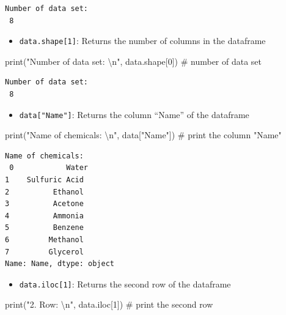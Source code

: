 \documentclass[
  letterpaper,
  DIV=11,
  numbers=noendperiod]{scrreprt}
\newenvironment{Shaded}{\begin{snugshade}}{\end{snugshade}}
\newcommand{\BuiltInTok}[1]{\textcolor[rgb]{0.00,0.23,0.31}{#1}}
\newcommand{\CharTok}[1]{\textcolor[rgb]{0.13,0.47,0.30}{#1}}
\newcommand{\CommentTok}[1]{\textcolor[rgb]{0.37,0.37,0.37}{#1}}
\newcommand{\DecValTok}[1]{\textcolor[rgb]{0.68,0.00,0.00}{#1}}
\newcommand{\NormalTok}[1]{\textcolor[rgb]{0.00,0.23,0.31}{#1}}
\newcommand{\StringTok}[1]{\textcolor[rgb]{0.13,0.47,0.30}{#1}}
\providecommand{\tightlist}{%
  \setlength{\itemsep}{0pt}\setlength{\parskip}{0pt}}\usepackage{longtable,booktabs,array}
\begin{document}
\begin{verbatim}
Number of data set: 
 8
\end{verbatim}

\begin{itemize}
\tightlist
\item
  \texttt{data.shape{[}1{]}}: Returns the number of columns in the
  dataframe
\end{itemize}

\begin{Shaded}
\begin{Highlighting}[]
\BuiltInTok{print}\NormalTok{(}\StringTok{"Number of data set: }\CharTok{\textbackslash{}n}\StringTok{"}\NormalTok{, data.shape[}\DecValTok{0}\NormalTok{]) }\CommentTok{\# number of data set}
\end{Highlighting}
\end{Shaded}

\begin{verbatim}
Number of data set: 
 8
\end{verbatim}

\begin{itemize}
\tightlist
\item
  \texttt{data{[}"Name"{]}}: Returns the column ``Name'' of the
  dataframe
\end{itemize}

\begin{Shaded}
\begin{Highlighting}[]
\BuiltInTok{print}\NormalTok{(}\StringTok{"Name of chemicals: }\CharTok{\textbackslash{}n}\StringTok{"}\NormalTok{, data[}\StringTok{"Name"}\NormalTok{]) }\CommentTok{\# print the column "Name"}
\end{Highlighting}
\end{Shaded}

\begin{verbatim}
Name of chemicals: 
 0            Water
1    Sulfuric Acid
2          Ethanol
3          Acetone
4          Ammonia
5          Benzene
6         Methanol
7         Glycerol
Name: Name, dtype: object
\end{verbatim}

\begin{itemize}
\tightlist
\item
  \texttt{data.iloc{[}1{]}}: Returns the second row of the dataframe
\end{itemize}

\begin{Shaded}
\begin{Highlighting}[]
\BuiltInTok{print}\NormalTok{(}\StringTok{"2. Row: }\CharTok{\textbackslash{}n}\StringTok{"}\NormalTok{, data.iloc[}\DecValTok{1}\NormalTok{]) }\CommentTok{\# print the second row}
\end{Highlighting}
\end{Shaded}
\end{document}
